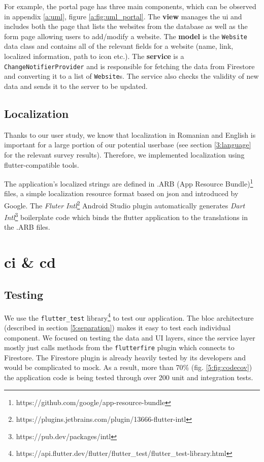 For example, the portal page has three main components, which can be observed in appendix \ref{a:uml}, figure \ref{a:fig:uml_portal}. The \textbf{view} manages the \acrshort{ui} and includes both the page that lists the websites from the database as well as the form page allowing users to add/modify a website. The \textbf{model} is the \texttt{Website} data class and contains all of the relevant fields for a website (name, link, localized information, path to icon etc.). The \textbf{service} is a \texttt{ChangeNotifierProvider} and is responsible for fetching the data from Firestore and converting it to a list of \texttt{Website}s. The service also checks the validity of new data and sends it to the server to be updated.

\subsection{Localization} \label{5:localization}
Thanks to our user study, we know that localization in Romanian and English is important for a large portion of our potential userbase (see section \ref{3:language} for the relevant survey results). Therefore, we implemented localization using \gls{flutter}-compatible tools.

The application's localized strings are defined in .ARB (App Resource Bundle)\footnote{https://github.com/google/app-resource-bundle} files, a simple localization resource format based on \gls{json} and introduced by Google. The \textit{Fluter Intl}\footnote{https://plugins.jetbrains.com/plugin/13666-flutter-intl} Android Studio plugin automatically generates \textit{Dart Intl}\footnote{https://pub.dev/packages/intl} boilerplate code which binds the \gls{flutter} application to the translations in the .ARB files.

\section{\acrshort{ci} \& \acrshort{cd}} \label{5:cicd}

\subsection{Testing} \label{5:cicd_testing}

We use the \texttt{flutter_test} library\footnote{https://api.flutter.dev/flutter/flutter\_test/flutter\_test-library.html} to test our application. The \gls{bloc} architecture (described in section \ref{5:separation}) makes it easy to test each individual component. We focused on testing the data and UI layers, since the service layer mostly just calls methods from the \texttt{flutterfire} plugin which connects to Firestore. The Firestore plugin is already heavily tested by its developers and would be complicated to mock. As a result, more than 70\% (fig. \ref{5:fig:codecov}) the application code is being tested through over 200 unit and integration tests.

